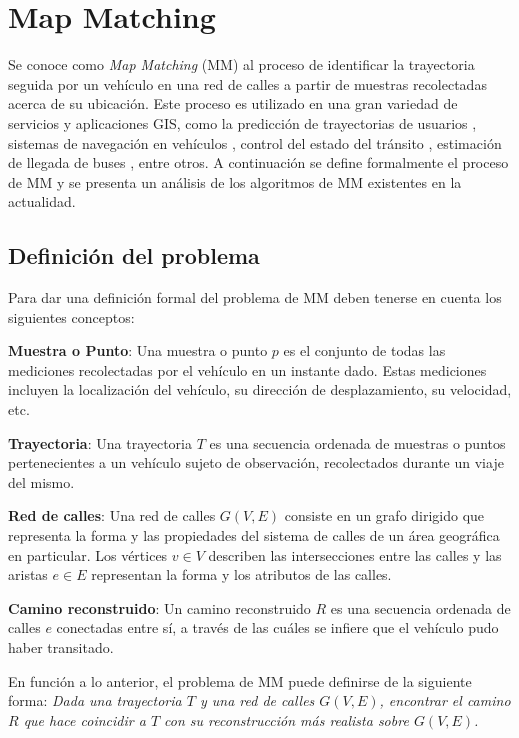 \chapter{Map Matching}
\label{cap:4}

Se conoce como \emph{Map Matching} (MM) al proceso de identificar la trayectoria seguida por un vehículo en una red de calles a partir de muestras recolectadas acerca de su ubicación. Este proceso es utilizado en una gran variedad de servicios y aplicaciones GIS, como la predicción de trayectorias de usuarios \citep{eisner2011algorithms}, sistemas de navegación en vehículos \citep{kim2001adaptive}, control del estado del tránsito \citep{thiagarajan2009vtrack}, estimación de llegada de buses \citep{thiagarajan2010cooperative}, entre otros. A continuación se define formalmente el proceso de MM y se presenta un análisis de los algoritmos de MM existentes en la actualidad.

\section{Definición del problema}

Para dar una definición formal del problema de MM deben tenerse en cuenta los siguientes conceptos:

\textbf{Muestra o Punto}: Una muestra o punto $p$ es el conjunto de todas las mediciones recolectadas por el vehículo en un instante dado. Estas mediciones incluyen la localización del vehículo, su dirección de desplazamiento, su velocidad, etc.

\textbf{Trayectoria}: Una trayectoria $T$ es una secuencia ordenada de muestras o puntos pertenecientes a un vehículo sujeto de observación, recolectados durante un viaje del mismo.

\textbf{Red de calles}: Una red de calles $G(V,E)$ consiste en un grafo dirigido que representa la forma y las propiedades del sistema de calles de un área geográfica en particular. Los vértices $v \in V$ describen las intersecciones entre las calles y las aristas $e \in E$ representan la forma y los atributos de las calles.

\textbf{Camino reconstruido}: Un camino reconstruido $R$ es una secuencia ordenada de calles $e$  conectadas entre sí, a través de las cuáles se infiere que el vehículo pudo haber transitado.

En función a lo anterior, el problema de MM puede definirse de la siguiente forma: \emph{Dada una trayectoria $T$ y una red de calles $G(V,E)$, encontrar el camino $R$ que hace coincidir a $T$ con su reconstrucción más realista sobre $G(V,E)$.}

